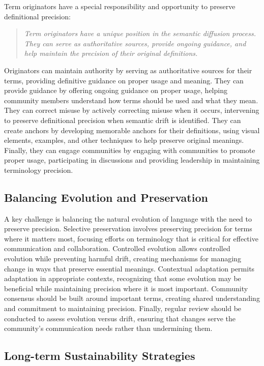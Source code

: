 \documentclass[11pt]{article}
\begin{document}
Term originators have a special responsibility and opportunity to preserve definitional precision:

\begin{quote}
\emph{Term originators have a unique position in the semantic diffusion process. They can serve as authoritative sources, provide ongoing guidance, and help maintain the precision of their original definitions.}
\end{quote}

Originators can maintain authority by serving as authoritative sources for their terms, providing definitive guidance on proper usage and meaning. They can provide guidance by offering ongoing guidance on proper usage, helping community members understand how terms should be used and what they mean. They can correct misuse by actively correcting misuse when it occurs, intervening to preserve definitional precision when semantic drift is identified. They can create anchors by developing memorable anchors for their definitions, using visual elements, examples, and other techniques to help preserve original meanings. Finally, they can engage communities by engaging with communities to promote proper usage, participating in discussions and providing leadership in maintaining terminology precision.

\subsection{Balancing Evolution and Preservation}

A key challenge is balancing the natural evolution of language with the need to preserve precision. Selective preservation involves preserving precision for terms where it matters most, focusing efforts on terminology that is critical for effective communication and collaboration. Controlled evolution allows controlled evolution while preventing harmful drift, creating mechanisms for managing change in ways that preserve essential meanings. Contextual adaptation permits adaptation in appropriate contexts, recognizing that some evolution may be beneficial while maintaining precision where it is most important. Community consensus should be built around important terms, creating shared understanding and commitment to maintaining precision. Finally, regular review should be conducted to assess evolution versus drift, ensuring that changes serve the community's communication needs rather than undermining them.

\subsection{Long-term Sustainability Strategies}
\end{document}
